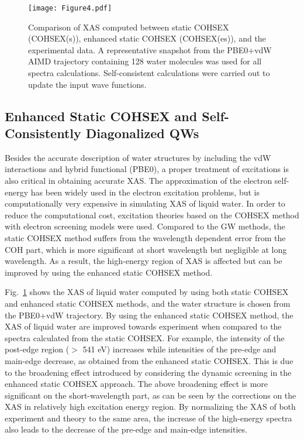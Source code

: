 \documentclass[prb,twocolumn,showpacs,preprintnumbers,superscriptaddress,amsmath,amssymb]{revtex4}
\begin{document}
\begin{figure}
  \texttt{[image: Figure4.pdf]}
  \caption{Comparison of XAS computed between static COHSEX (COHSEX(s)),
enhanced static COHSEX (COHSEX(es)), and the experimental data.\cite{schreck2016isotope}
A representative snapshot from the PBE0+vdW AIMD trajectory
containing 128 water molecules was used for all spectra calculations.
Self-consistent calculations were carried out to update the input wave functions.}
  \label{figenhance}
\end{figure}


\subsection{Enhanced Static COHSEX and Self-Consistently Diagonalized QWs}
Besides the accurate description of water structures by including
the vdW interactions and hybrid functional (PBE0),
a proper treatment of excitations is also critical in obtaining accurate XAS.
The approximation of the electron self-energy has been widely used in the electron excitation problems,
but is computationally very expensive in simulating XAS of liquid water.
In order to reduce the computational cost,
excitation theories based on the COHSEX method with electron screening models were used.\cite{chen2010PRLxas,kong2012PRB}
Compared to the GW methods, the static COHSEX method suffers from the wavelength dependent error from the COH part,
which is more significant at short wavelength but negligible at long wavelength.\cite{kang2010enhanced}
As a result, the high-energy region of XAS is affected but can be improved
by using the enhanced static COHSEX method.\cite{kang2010enhanced}


Fig.~\ref{figenhance} shows the XAS of liquid water computed by using both static COHSEX
and enhanced static COHSEX methods, and the water structure is chosen from the PBE0+vdW
trajectory. By using the enhanced static COHSEX method,
the XAS of liquid water are improved towards experiment when compared to
the spectra calculated from the static COHSEX.
For example, the intensity of the post-edge region ($>$ 541 eV)
increases while intensities of the pre-edge and main-edge decrease, as obtained from the enhanced static COHSEX.
This is due to the broadening effect introduced by considering the dynamic screening
in the enhanced static COHSEX approach.
The above broadening effect is more significant on the short-wavelength part,
as can be seen by the corrections on the XAS in relatively high excitation energy region.
By normalizing the XAS of both experiment and theory to the same area,
the increase of the high-energy spectra also leads to the decrease
of the pre-edge and main-edge intensities.
\end{document}
